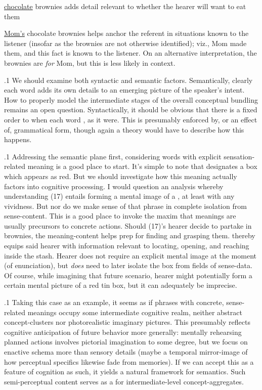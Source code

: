 \documentclass[11pt, twocolumn]{article}
\begin{document}
{{{\begin{itemz}
\symItem{}   \underline{chocolate} brownies \sarr{}   adds detail relevant to whether the
hearer will want to eat them
 
\symItem{}   \underline{Mom's} chocolate brownies \sarr{}  helps anchor the referent in situations
known to the listener (insofar as the brownies are not otherwise identified);
viz., Mom made them, and this fact is known to the listener. On an alternative interpretation,
the brownies are \textit{for} Mom, but this is less likely in context.

\end{itemz}

}%

\p.1{%
We should examine both syntactic and semantic factors.
Semantically, clearly each word adds its own
details to an emerging picture of the speaker's intent.
How to properly model the intermediate stages
of the overall conceptual bundling remains an open
question. Syntactically, it should be obvious that
there is a fixed order to when each word ,
as it were. This is presumably enforced by, or an effect of,
grammatical form, though again a theory would have to
describe how this happens.
}%

\p.1{%
Addressing the semantic plane first, considering words with
explicit sensation-related meaning is a good place to start.
It's simple to note that  designates a box which
appears as red. But we should investigate how this
meaning actually factors into cognitive processing. I would
question an analysis whereby understanding \exsRef(17) entails forming a
mental image of a , at least with any
vividness. But nor do we make sense of that phrase in
complete isolation from sense-content. This is a good
place to invoke the maxim that meanings are usually precursors
to concrete actions. Should \exsRef(17)'s hearer decide to partake in
brownies, the meaning-content helps prep for finding and grasping them.
 thereby equips said hearer with
information relevant to locating, opening, and reaching inside the stash.
Hearer does not require an explicit mental image at the moment
(of enunciation), but \textit{does} need to later isolate the box from
fields of sense-data. Of course, while imagining that future scenario,
hearer might potentially form a certain mental picture of a red tin box,
but it can adequately be imprecise.
}%

\p.1{%
Taking this case as an example, it seems as if phrases
with concrete, sense-related meanings occupy some intermediate
cognitive realm, neither abstract concept-clusters nor
photorealistic imaginary pictures. This presumably reflects
cognitive anticipation of future behavior more generally: mentally
rehearsing planned actions involves pictorial imagination to
some degree, but we focus on enactive schema more than sensory
details (maybe a temporal mirror-image of how perceptual
specifics likewise fade from memories).
If we can accept this as a feature of cognition as such, it yields a
natural framework for semantics. Such semi-perceptual content
serves as a  for intermediate-level concept-aggregates.
}%

}}
\end{document}
